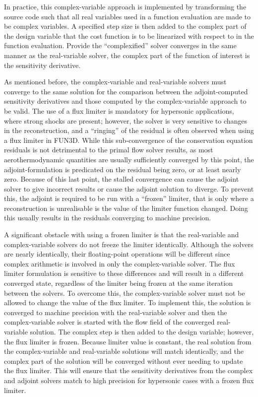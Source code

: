 In practice, this complex-variable approach is implemented by transforming the
source code such that all real variables used in a function evaluation are made
to be complex variables.  A specified step size is then added to the complex
part of the design variable that the cost function is to be linearized with
respect to in the function evaluation.  Provide the ``complexified'' solver
converges in the same manner as the real-variable solver, the complex part of
the function of interest is the sensitivity derivative.

As mentioned before, the complex-variable and real-variable solvers must
converge to the same solution for the comparison between the adjoint-computed
sensitivity derivatives and those computed by the complex-variable approach to
be valid.  The use of a flux limiter is mandatory for hypersonic applications,
where strong shocks are present; however, the solver is very sensitive to
changes in the reconstruction, and a ``ringing'' of the residual is often
observed\cite{gnoffo2007ringing} when using a flux limiter in FUN3D. While this
sub-convergence of the conservation equation residuals is not detrimental to the
primal flow solver results, as most aerothermodynamic quantities are usually
sufficiently converged by this point, the adjoint-formulation is predicated on
the residual being zero, or at least nearly zero.  Because of this last point,
the stalled convergence can cause the adjoint solver to give incorrect results
or cause the adjoint solution to diverge.  To prevent this, the adjoint is
required to be run with a ``frozen'' limiter, that is only where a
reconstruction is unrealisable is the value of the limiter function changed.
 Doing this usually results in the residuals converging to machine precision.

A significant obstacle with using a frozen limiter is that the real-variable and
complex-variable solvers do not freeze the limiter identically.  Although the
solvers are nearly identically, their floating-point operations will be
different since complex arithmetic is involved in only the complex-variable
solver.  The flux limiter formulation is sensitive to these differences and will
result in a different converged state, regardless of the limiter being frozen
at the same iteration between the solvers.  To overcome this, the
complex-variable solver must not be allowed to change the value of the flux
limiter.  To implement this, the solution is converged to machine precision with
the real-variable solver and then the complex-variable solver is started with
the flow field of the converged real-variable solution.  The complex step is
then added to the design variable; however, the flux limiter is frozen.  Because
limiter value is constant, the real solution from the complex-variable and
real-variable solutions will match identically, and the complex part of the
solution will be converged without ever needing to update the flux limiter.
This will ensure that the sensitivity derivatives from the complex and adjoint
solvers match to high precision for hypersonic cases with a frozen flux limiter.

